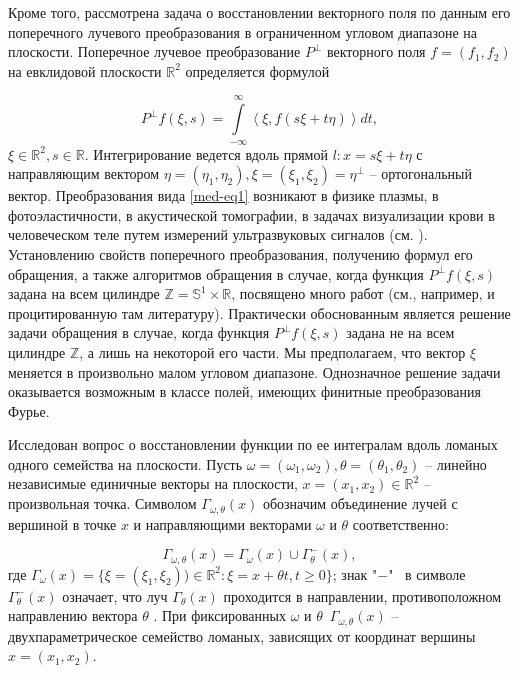 
Кроме того, рассмотрена задача о восстановлении векторного поля по данным его поперечного лучевого преобразования в ограниченном угловом диапазоне на плоскости. Поперечное лучевое преобразование $P^\bot$ векторного поля $f=(f_1,f_2)$ на евклидовой плоскости $\mathbb R^2$ определяется формулой

\begin{equation}\label{med-eq1}
P^\bot f(\xi,s)=\int\limits_{-\infty}^\infty\left<\xi,f(s\xi+t\eta)\right>dt,
\end{equation}
$\xi\in\mathbb R^2, s\in\mathbb R$. Интегрирование ведется вдоль прямой $l: x=s\xi+t\eta$ с направляющим вектором $\eta=(\eta_1, \eta_2),  \xi=(\xi_1,\xi_2)=\eta^\bot$ -- ортогональный вектор. Преобразования вида \eqref{med-eq1} возникают в физике плазмы, в фотоэластичности, в акустической томографии, в задачах визуализации крови в человеческом теле путем измерений ультразвуковых сигналов (см. \cite{med-metka1,med-metka2}).
Установлению свойств поперечного преобразования, получению формул его обращения, а также алгоритмов обращения  в случае, когда функция  $P^\bot f(\xi,s)$ задана на всем цилиндре $\mathbb Z=\mathbb S^1\times\mathbb R$, посвящено много работ (см., например, \cite{med-metka2} и процитированную там литературу). Практически обоснованным является решение задачи обращения в случае, когда функция  $P^\bot f(\xi,s)$ задана не на всем цилиндре $\mathbb Z$, а лишь на некоторой его части. Мы предполагаем, что вектор $\xi$ меняется в произвольно малом угловом диапазоне. Однозначное решение задачи оказывается возможным в классе полей, имеющих финитные преобразования Фурье.

Исследован вопрос о восстановлении функции по ее интегралам вдоль ломаных одного семейства на плоскости.
Пусть $\omega=(\omega_1,\omega_2), \theta=(\theta_1, \theta_2)$ -- линейно независимые единичные векторы на плоскости, $x=(x_1, x_2)\in\mathbb R^2$ -- произвольная точка. Символом $\Gamma_{\omega, \theta}(x)$ обозначим объединение лучей с вершиной в точке $x$ и направляющими векторами $\omega$ и $\theta$ соответственно:

$$\Gamma_{\omega, \theta}(x)=\Gamma_{\omega}(x)\cup \Gamma_{\theta}^-(x),$$
где $\Gamma_{\omega}(x)=\{\xi=(\xi_1,\xi_2))\in\mathbb R^2:\xi=x+\theta t, t\geq 0\}$; знак "$-$" $\,$  в символе $\Gamma_{\theta}^-(x)$ означает, что луч  $\Gamma_{\theta}(x)$ проходится в направлении, противоположном направлению вектора $\theta$ . При фиксированных $\omega$ и $\theta$ $\,\Gamma_{\omega, \theta}(x)$ -- двухпараметрическое семейство ломаных, зависящих от координат вершины $x=(x_1,x_2)$.

